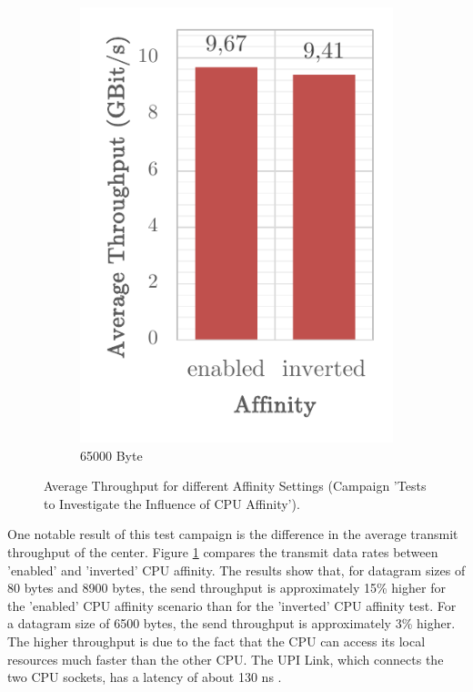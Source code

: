 \begin{figure}[h]
\begin{subfigure}[b]{0.32\textwidth}
        \includegraphics[width=\textwidth]{figures/reliability/ihawk/diagr10c.pdf}
        \caption{65000 Byte}
    \end{subfigure}
    \caption{Average Throughput for different Affinity Settings (Campaign 'Tests to Investigate the Influence of CPU Affinity').}
    \label{fig:diagr10Throuhput}
\end{figure}

One notable result of this test campaign is the difference in the average transmit throughput of the center. Figure \ref{fig:diagr10Throuhput} compares the transmit data rates between 'enabled' and 'inverted' CPU affinity. The results show that, for datagram sizes of 80 bytes and 8900 bytes, the send throughput is approximately 15\% higher for the 'enabled' CPU affinity scenario than for the 'inverted' CPU affinity test. For a datagram size of 6500 bytes, the send throughput is approximately 3\% higher. The higher throughput is due to the fact that the CPU can access its local resources much faster than the other CPU. The UPI Link, which connects the two CPU sockets, has a latency of about 130 ns \cite{setup07}.

